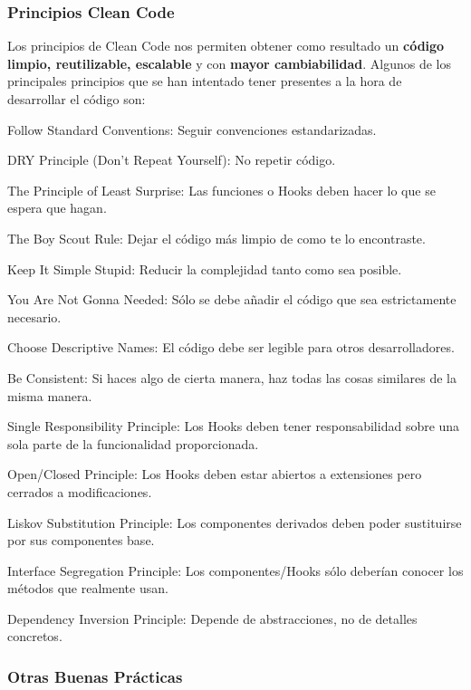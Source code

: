 \documentclass[12pt,twoside,titlepage]{report}
\begin{document}
\subsubsection{Principios Clean Code}

Los principios de Clean Code nos permiten obtener como resultado un \textbf{código limpio, reutilizable, escalable} y con \textbf{mayor cambiabilidad}. Algunos de los principales principios que se han intentado tener presentes a la hora de desarrollar el código son:

\begin{compactitem}
    \item Follow Standard Conventions: Seguir convenciones estandarizadas.
    \item DRY Principle (Don't Repeat Yourself): No repetir código.
    \item The Principle of Least Surprise: Las funciones o Hooks deben hacer lo que se espera que hagan.
    \item The Boy Scout Rule: Dejar el código más limpio de como te lo encontraste.
    \item Keep It Simple Stupid: Reducir la complejidad tanto como sea posible.
    \item You Are Not Gonna Needed: Sólo se debe añadir el código que sea estrictamente necesario.
    \item Choose Descriptive Names: El código debe ser legible para otros desarrolladores.
    \item Be Consistent: Si haces algo de cierta manera, haz todas las cosas similares de la misma manera.
    \item Single Responsibility Principle: Los Hooks deben tener responsabilidad sobre una sola parte de la funcionalidad proporcionada.
    \item Open/Closed Principle: Los Hooks deben estar abiertos a extensiones pero cerrados a modificaciones.
    \item Liskov Substitution Principle: Los componentes derivados deben poder sustituirse por sus componentes base.
    \item Interface Segregation Principle: Los componentes/Hooks sólo deberían conocer los métodos que realmente usan.
    \item Dependency Inversion Principle: Depende de abstracciones, no de detalles concretos.
\end{compactitem}

\subsubsection{Otras Buenas Prácticas}
\end{document}
